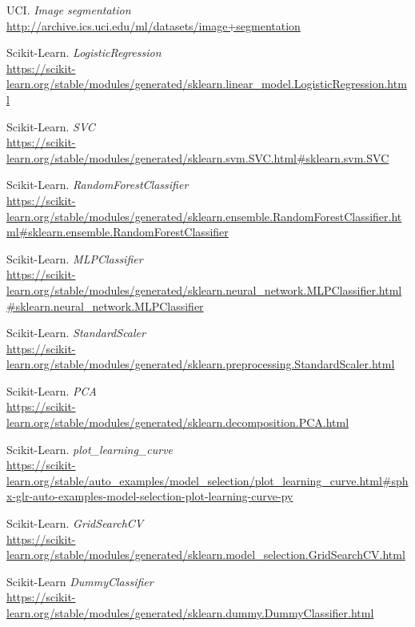 \documentclass[11pt,a4paper]{article}
\begin{document}
\begin{thebibliography}{25}

UCI. \textit{Image segmentation}
\\\url{http://archive.ics.uci.edu/ml/datasets/image+segmentation}

Scikit-Learn. \textit{LogisticRegression}
\\\url{https://scikit-learn.org/stable/modules/generated/sklearn.linear_model.LogisticRegression.html}

Scikit-Learn. \textit{SVC}
\\\url{https://scikit-learn.org/stable/modules/generated/sklearn.svm.SVC.html#sklearn.svm.SVC}

Scikit-Learn. \textit{RandomForestClassifier}
\\\url{https://scikit-learn.org/stable/modules/generated/sklearn.ensemble.RandomForestClassifier.html#sklearn.ensemble.RandomForestClassifier}

Scikit-Learn. \textit{MLPClassifier}
\\\url{https://scikit-learn.org/stable/modules/generated/sklearn.neural_network.MLPClassifier.html#sklearn.neural_network.MLPClassifier}

Scikit-Learn. \textit{StandardScaler}
\\\url{https://scikit-learn.org/stable/modules/generated/sklearn.preprocessing.StandardScaler.html}

Scikit-Learn. \textit{PCA}
\\\url{https://scikit-learn.org/stable/modules/generated/sklearn.decomposition.PCA.html}

Scikit-Learn. \textit{plot\_learning\_curve}
\\\url{https://scikit-learn.org/stable/auto_examples/model_selection/plot_learning_curve.html#sphx-glr-auto-examples-model-selection-plot-learning-curve-py}

Scikit-Learn. \textit{GridSearchCV}
\\\url{https://scikit-learn.org/stable/modules/generated/sklearn.model_selection.GridSearchCV.html}

Scikit-Learn \textit{DummyClassifier}
\\\url{https://scikit-learn.org/stable/modules/generated/sklearn.dummy.DummyClassifier.html}


\end{thebibliography}
\end{document}
